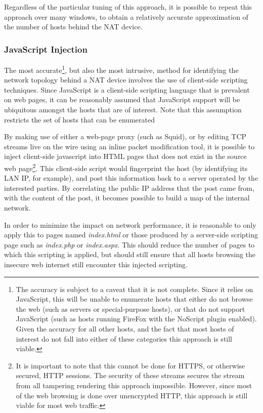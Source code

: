 \documentclass{article}
\theoremstyle{remark}
\theoremstyle{definition}
\theoremstyle{definition}
\theoremstyle{definition}
\begin{document}
Regardless of the particular tuning of this approach, it is possible to repeat this approach over many windows, to obtain a relatively accurate approximation of the number of hosts behind the NAT device.

\subsubsection{JavaScript Injection}
\label{nat-js}
The most accurate\footnote{The accuracy is subject to a caveat that it is not complete. Since it relies on JavaScript, this will be unable to enumerate hosts that either do not browse the web (such as servers or special-purpose hosts), or that do not support JavaScript (such as hosts running FireFox with the NoScript plugin enabled). Given the accuracy for all other hosts, and the fact that most hosts of interest do not fall into either of these categories this approach is still viable.}, but also the most intrusive, method for identifying the network topology behind a NAT device involves the use of client-side scripting techniques. Since JavaScript is a client-side scripting language that is prevalent on web pages, it can be reasonably assumed that JavaScript support will be ubiquitous amongst the hosts that are of interest. Note that this assumption restricts the set of hosts that can be enumerated

By making use of either a web-page proxy (such as Squid), or by editing TCP streams live on the wire using an inline packet modification tool, it is possible to inject client-side javascript into HTML pages that does not exist in the source web page\footnote{It is important to note that this cannot be done for HTTPS, or otherwise secured, HTTP sessions. The security of these streams secures the stream from all tampering rendering this approach impossible. However, since most of the web browsing is done over unencrypted HTTP, this approach is still viable for most web traffic.}. This client-side script would fingerprint the host (by identifying its LAN IP, for example), and post this information back to a server operated by the interested parties. By correlating the public IP address that the post came from, with the content of the post, it becomes possible to build a map of the internal network.

In order to minimize the impact on network performance, it is reasonable to only apply this to pages named \emph{index.html} or those produced by a server-side scripting page such as \emph{index.php} or \emph{index.aspx}. This should reduce the number of pages to which this scripting is applied, but should still ensure that all hosts browsing the insecure web internet still encounter this injected scripting.
\end{document}
